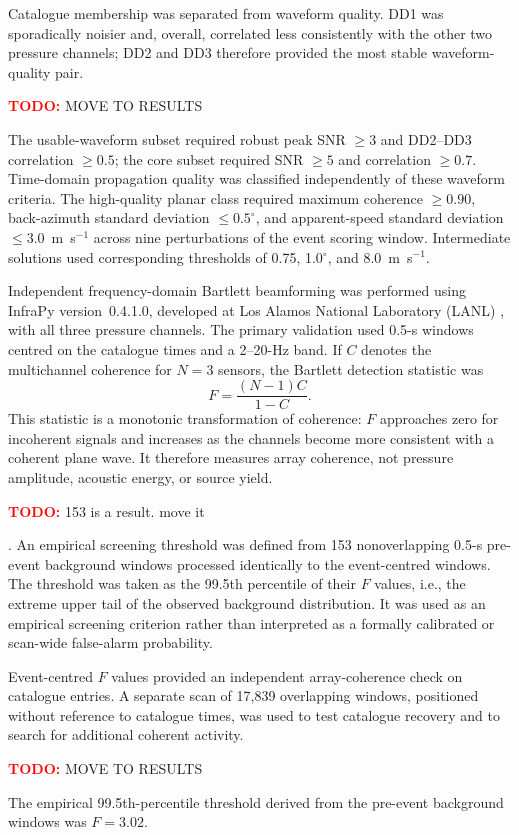 \documentclass[]{seismica}
\newcommand{\todo}[1]{%
  \par\noindent
  \colorbox{yellow!40}{%
    \parbox{0.96\linewidth}{%
      \textbf{\textcolor{red}{TODO:}} #1
    }%
  }%
  \par
}
\begin{document}
Catalogue membership was separated from waveform quality. DD1 was
sporadically noisier and, overall, correlated less consistently with the other
two pressure channels; DD2 and DD3 therefore provided the most stable
waveform-quality pair. 

\todo{MOVE TO RESULTS}The usable-waveform subset required robust peak
SNR $\geq3$ and DD2--DD3 correlation $\geq0.5$; the core subset required
SNR $\geq5$ and correlation $\geq0.7$. Time-domain propagation quality was classified independently of
these waveform criteria. The high-quality planar class required maximum
coherence $\geq0.90$, back-azimuth standard deviation
$\leq0.5^\circ$, and apparent-speed standard deviation
$\leq3.0$~m~s$^{-1}$ across nine perturbations of the event scoring window.
Intermediate solutions used corresponding thresholds of 0.75,
1.0$^\circ$, and 8.0~m~s$^{-1}$.

Independent frequency-domain Bartlett beamforming was performed using InfraPy
version~0.4.1.0, developed at Los Alamos National Laboratory (LANL)
\citep{webster_infrapy_2025}, with all three pressure channels.
The primary validation used 0.5-s windows centred on the catalogue
times and a 2--20-Hz band. If $C$ denotes the multichannel coherence for
$N=3$ sensors, the Bartlett detection statistic was
\begin{equation}
 F=\frac{(N-1)C}{1-C}.
\end{equation}
This statistic is a monotonic transformation of coherence: $F$ approaches
zero for incoherent signals and increases as the channels become more
consistent with a coherent plane wave. It therefore measures array coherence,
not pressure amplitude, acoustic energy, or source yield.

\todo{153 is a result. move it}. 
An empirical screening threshold was defined from 153 nonoverlapping
0.5-s pre-event background windows processed identically to the event-centred
windows. The threshold was taken as the 99.5th percentile of their $F$
values, i.e., the extreme upper tail of the observed background distribution.
It was used as an empirical screening criterion rather than interpreted as a
formally calibrated or scan-wide false-alarm probability.

Event-centred $F$ values provided an independent array-coherence check on
catalogue entries. A separate scan of 17,839 overlapping windows, positioned
without reference to catalogue times, was used to test catalogue recovery and
to search for additional coherent activity.

\todo{MOVE TO RESULTS}
The empirical 99.5th-percentile threshold derived from the pre-event
background windows was $F=3.02$.
\end{document}
